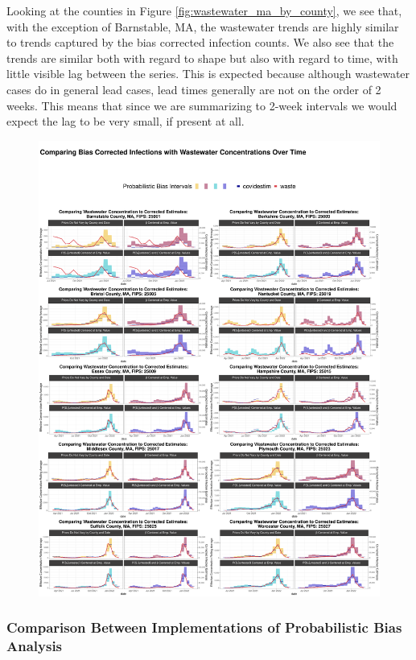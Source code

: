 \documentclass[12pt,twoside]{smiththesis}
\begin{document}
Looking at the counties in Figure \ref{fig:wastewater_ma_by_county}, we see that, with the exception of Barnstable, MA, the wastewater trends are highly similar to trends captured by the bias corrected infection counts. We also see that the trends are similar both with regard to shape but also with regard to time, with little visible lag between the series. This is expected because although wastewater cases do in general lead cases, lead times generally are not on the order of 2 weeks. This means that since we are summarizing to 2-week intervals we would expect the lag to be very small, if present at all.
\begin{figure}
\includegraphics[width=1\linewidth]{figure/wastewater_ma_by_county} \caption{\label{fig:wastewater_ma_by_county}}\label{fig:unnamed-chunk-20}
\end{figure}
\hypertarget{comparison-between-implementations-of-probabilistic-bias-analysis}{%
\subsubsection{Comparison Between Implementations of Probabilistic Bias Analysis}\label{comparison-between-implementations-of-probabilistic-bias-analysis}}
\end{document}
